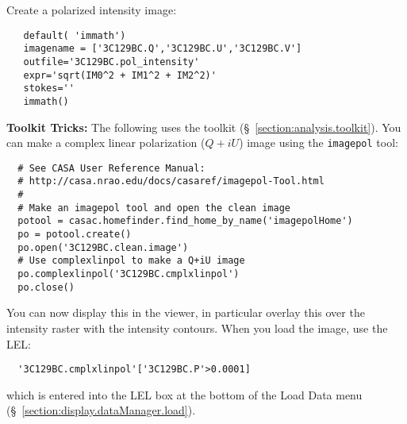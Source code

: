 Create a polarized intensity image:
\small
\begin{verbatim}
   default( 'immath')
   imagename = ['3C129BC.Q','3C129BC.U','3C129BC.V']
   outfile='3C129BC.pol_intensity'
   expr='sqrt(IM0^2 + IM1^2 + IM2^2)'
   stokes=''
   immath()
\end{verbatim}
\normalsize

{\bf Toolkit Tricks:} The following uses the toolkit 
(\S~\ref{section:analysis.toolkit}).
You can make a complex linear polarization ($Q+iU$) image using the
{\tt imagepol} tool:
\small
\begin{verbatim}
  # See CASA User Reference Manual:
  # http://casa.nrao.edu/docs/casaref/imagepol-Tool.html
  #
  # Make an imagepol tool and open the clean image 
  potool = casac.homefinder.find_home_by_name('imagepolHome')
  po = potool.create()
  po.open('3C129BC.clean.image')
  # Use complexlinpol to make a Q+iU image
  po.complexlinpol('3C129BC.cmplxlinpol')
  po.close()
\end{verbatim}
\normalsize
You can now display this in the viewer, in particular overlay this
over the intensity raster with the intensity contours.  
When you load the image, use the LEL:
\small
\begin{verbatim}
  '3C129BC.cmplxlinpol'['3C129BC.P'>0.0001]
\end{verbatim}
\normalsize
which is entered into the LEL box at the bottom of the Load Data menu
(\S~\ref{section:display.dataManager.load}).

%
%
%
%
%

